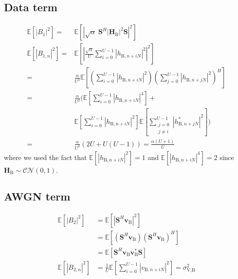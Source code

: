 \documentclass[journal,comsoc]{IEEEtran}
\newcommand{\module}[1]{\left|#1\right|}
\newcommand{\EX}[1]{\mathbb{E} \left[#1\right]}%
\newcommand{\HB}{\textbf{H}_{\text{B}}}
\newcommand{\vb}{\textbf{v}_{\text{B}}}
\newcommand{\spread}{\textbf{S}}
\begin{document}
\subsection{Data term}\label{sec:data-term-app}
\begin{equation}
	\begin{split}
		\EX{|B_1|^2} =& \EX{\module{\sqrt{\alpha} \; \spread^H \module{\HB}^2 \spread}^2} \\
		\EX{|B_{1,n}|^2} =&\EX{\left|\frac{\sqrt{\alpha}}{U}\sum_{i=0}^{U-1} \left| h_{\text{B}, n + iN}\right|^2\right|^2}  \\
		=& \frac{\alpha}{U^2} \EX{\left(\sum_{i=0}^{U-1} \left| h_{\text{B}, n + iN}\right|^2\right) \left(\sum_{j=0}^{U-1} \left| h_{\text{B}, n + jN}\right|^2\right)^H}\\
		=&  \frac{\alpha}{U^2} \Big(\EX{\sum_{i=0}^{U-1}\left| h_{\text{B}, n + iN}\right|^4} +\\
		& \EX{\sum_{i=0}^{U-1}\left| h_{\text{B}, n + iN}\right|^2}\EX{\sum_{\substack{j=0 \\ j\neq i}}^{U-1} | h^*_{\text{B}, n + jN}|^2} \Big) \\
		=& \frac{\alpha}{U^2} \left( 2U + U(U-1)\right) = \frac{\alpha (U+1)}{U}
	\end{split}
	\label{eq:appA:data_bob-app}
\end{equation}
where we used the fact that $\EX{\left| h_{\text{B}, n + iN}\right|^2} = 1$ and $\EX{\left| h_{\text{B}, n + iN}\right|^4} = 2$ since $\HB \sim \mathcal{CN}(0,1)$.



\subsection{AWGN term}\label{sec:awgn-term-app}
\begin{equation}
	\begin{split}
		\EX{|B_2|^2} &=  \EX{\module{\spread^H \vb}^2} \\
		&= \EX{\left(\spread^H \vb \right)\left(\spread^H \vb \right)^H} \\
		&=\EX{\spread^H \vb \vb^* \spread } \\
		\EX{|B_{2,n}|^2} &= \frac{1}{U} \EX{\sum_{i=0}^{U-1} |v_{\text{B}, n + iN}|^2} = \sigma^2_{\text{V,B}}
	\end{split}
	\label{eq:appA:noise_bob-app}
\end{equation}
\end{document}
